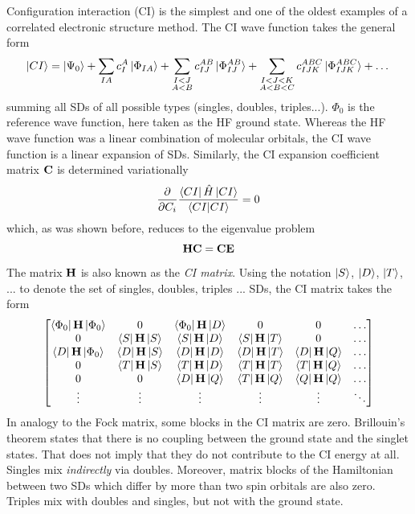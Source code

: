Configuration interaction (CI) is the simplest and one of the oldest examples of a correlated electronic structure method. The CI wave function takes the general form
\begin{equation}
\ket{CI} = \ket{\smash{\Psi_0}} + \sum_{IA} c_{I}^{A} \ket{\smash{\Phi_{IA}}} + \sum_{\substack{I < J \\ A < B}} c_{IJ}^{AB} \ket{\smash{\Phi_{IJ}^{AB}}} + \sum_{\substack{I < J < K \\ A < B < C}} c_{IJK}^{ABC} \ket{\smash{\Phi_{IJK}^{ABC}}} + \dots
\end{equation}
\noindent summing all SDs of all possible types (singles, doubles, triples...). $\Phi_0$ is the reference wave function, here taken as the HF ground state. Whereas the HF wave function was a linear combination of molecular orbitals, the CI wave function is a linear expansion of SDs. Similarly, the CI expansion coefficient matrix $\mathbf{C}$ is determined variationally
\begin{equation}
\frac{\partial}{\partial C_i} \frac{\bra{\smash{CI}}\hat{H}\ket{\smash{CI}}}{\bra{\smash{CI}}\ket{\smash{CI}}} = 0
\end{equation}
\noindent which, as was shown before, reduces to the eigenvalue problem
\begin{equation}
\mathbf{H}\mathbf{C} = \mathbf{C}\mathbf{E}
\end{equation}
\noindent The matrix $\mathbf{H}$ is also known as the \emph{CI matrix}. Using the notation $\ket{S}$, $\ket{D}$, $\ket{T}$, ... to denote the set of singles, doubles, triples ... SDs, the CI matrix takes the form
\begin{equation}
\begin{bmatrix}
\bra{\Phi_0}\mathbf{H}\ket{\Phi_0} & 0 & \bra{\Phi_0}\mathbf{H}\ket{D} & 0 & 0 & \ldots \\
0 & \bra{S}\mathbf{H}\ket{S} & \bra{S}\mathbf{H}\ket{D} & \bra{S}\mathbf{H}\ket{T} & 0 & \ldots \\
\bra{D}\mathbf{H}\ket{\Phi_0} & \bra{D}\mathbf{H}\ket{S} & \bra{D}\mathbf{H}\ket{D} & \bra{D}\mathbf{H}\ket{T} & \bra{D}\mathbf{H}\ket{Q} & \ldots \\
0 & \bra{T}\mathbf{H}\ket{S} & \bra{T}\mathbf{H}\ket{D} & \bra{T}\mathbf{H}\ket{T} & \bra{T}\mathbf{H}\ket{Q} & \ldots \\
0 & 0 & \bra{D}\mathbf{H}\ket{Q} & \bra{T}\mathbf{H}\ket{Q} & \bra{Q}\mathbf{H}\ket{Q} & \ldots \\
\vdots & \vdots & \vdots & \vdots & \vdots & \ddots  
\end{bmatrix}
\end{equation}
\noindent In analogy to the Fock matrix, some blocks in the CI matrix are zero. Brillouin's theorem states that there is no coupling between the ground state and the singlet states. That does not imply that they do not contribute to the CI energy at all. Singles mix \emph{indirectly} via doubles. Moreover, matrix blocks of the Hamiltonian between two SDs which differ by more than two spin orbitals are also zero. Triples mix with doubles and singles, but not with the ground state.

